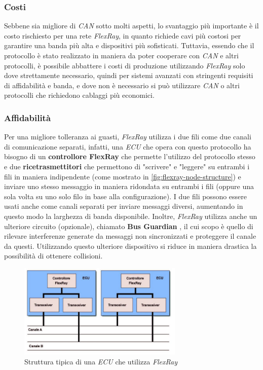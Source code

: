 \subsubsection{Costi}
Sebbene sia migliore di \emph{CAN} sotto molti aspetti, lo svantaggio più importante è il costo rischiesto per una rete \emph{FlexRay}, in quanto richiede cavi più costosi per garantire una banda più alta e dispositivi più sofisticati. Tuttavia, essendo che il protocollo è stato realizzato in maniera da poter cooperare con \emph{CAN} e altri protocolli, è possibile abbattere i costi di produzione utilizzando \emph{FlexRay} solo dove strettamente necessario, quindi per sistemi avanzati con stringenti requisiti di affidabilità e banda, e dove non è necessario si può utilizzare \emph{CAN} o altri protocolli che richiedono cablaggi più economici. \cite{eos_flexray}

\subsubsection{Affidabilità}
Per una migliore tolleranza ai guasti, \emph{FlexRay} utilizza i due fili come due canali di comunicazione separati, infatti, una \emph{ECU} che opera con questo protocollo ha bisogno di un \textbf{controllore FlexRay} che permette l'utilizzo del protocollo stesso e due \textbf{ricetrasmettitori} che permettono di "scrivere" e "leggere" su entrambi i fili in maniera indipendente (come mostrato in \autoref{fig:flexray-node-structure}) e inviare uno stesso messaggio in maniera ridondata su entrambi i fili (oppure una sola volta su uno solo filo in base alla configurazione). I due fili possono essere usati anche come canali separati per inviare messaggi diversi, aumentando in questo modo la larghezza di banda disponibile. Inoltre, \emph{FlexRay} utilizza anche un ulteriore circuito (opzionale), chiamato \textbf{Bus Guardian} \cite{eos_flexray}, il cui scopo è quello di rilevare interferenze generate da messaggi non sincronizzati e proteggere il canale da questi. Utilizzando questo ulteriore dispositivo si riduce in maniera drastica la possibilità di ottenere collisioni. \cite{eos_flexray}

\begin{figure}[h]
    \centering
    \includegraphics[width=0.7\textwidth]{capitoli/figure-protocolli/flexray-node-structure.jpg}
    \caption{Struttura tipica di una \emph{ECU} che utilizza \emph{FlexRay}}
    \label{fig:flexray-node-structure}
\end{figure}

